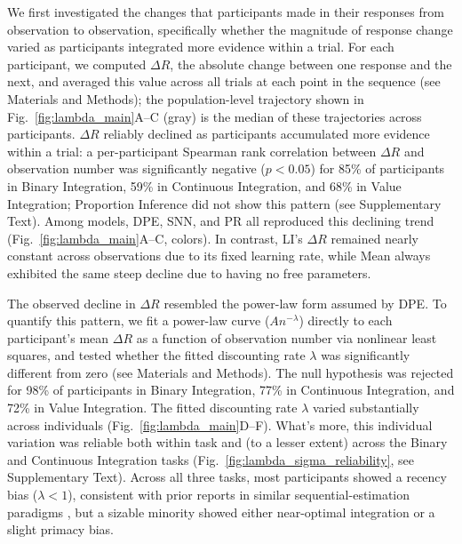\documentclass[12pt]{article}
\begin{document}
We first investigated the changes that participants made in their responses from observation to observation, specifically whether the magnitude of response change varied as participants integrated more evidence within a trial. For each participant, we computed $\Delta R$, the absolute change between one response and the next, and averaged this value across all trials at each point in the sequence (see Materials and Methods); the population-level trajectory shown in Fig.~\ref{fig:lambda_main}A--C (gray) is the median of these trajectories across participants. $\Delta R$ reliably declined as participants accumulated more evidence within a trial: a per-participant Spearman rank correlation between $\Delta R$ and observation number was significantly negative ($p<0.05$) for 85\% of participants in Binary Integration, 59\% in Continuous Integration, and 68\% in Value Integration; Proportion Inference did not show this pattern (see Supplementary Text). Among models, DPE, SNN, and PR all reproduced this declining trend (Fig.~\ref{fig:lambda_main}A--C, colors). In contrast, LI's $\Delta R$ remained nearly constant across observations due to its fixed learning rate, while Mean always exhibited the same steep decline due to having no free parameters.

The observed decline in $\Delta R$ resembled the power-law form assumed by DPE. To quantify this pattern, we fit a power-law curve ($A n^{-\lambda}$) directly to each participant's mean $\Delta R$ as a function of observation number via nonlinear least squares, and tested whether the fitted discounting rate $\lambda$ was significantly different from zero (see Materials and Methods). The null hypothesis was rejected for 98\% of participants in Binary Integration, 77\% in Continuous Integration, and 72\% in Value Integration. The fitted discounting rate $\lambda$ varied substantially across individuals (Fig.~\ref{fig:lambda_main}D--F). What's more, this individual variation was reliable both within task and (to a lesser extent) across the Binary and Continuous Integration tasks (Fig.~\ref{fig:lambda_sigma_reliability}, see Supplementary Text). Across all three tasks, most participants showed a recency bias ($\lambda<1$), consistent with prior reports in similar sequential-estimation paradigms \cite{yoo2025people, kalm2018visual, baddeley2022recency, feher2017exploration}, but a sizable minority showed either near-optimal integration or a slight primacy bias.
\end{document}
